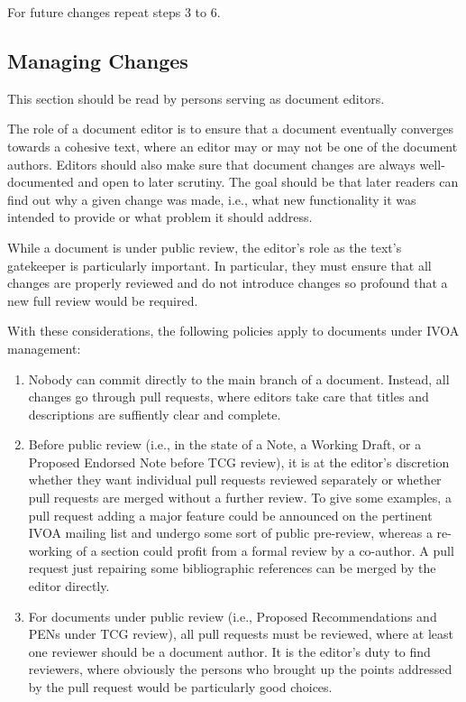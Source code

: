 \documentclass[11pt,a4paper]{ivoa}
\begin{document}
For future changes repeat steps 3 to 6.

\subsection{Managing Changes}
\label{sect:chmgt}

This section should be read by persons serving as document editors.

The role of a document editor is to ensure that a document eventually
converges towards a cohesive text, where an editor may or may not be one
of the document authors.  Editors should also make sure that
document changes are always well-documented and open to later scrutiny.
The goal should be that later readers can find out why a given change
was made, i.e., what new functionality it was intended to provide or
what problem it should address.

While a document is under public review, the editor's role as the text's
gatekeeper is particularly important.  In particular, they must ensure
that all changes are properly reviewed and do not introduce changes so
profound that a new full review would be required.

With these considerations, the following policies apply to documents
under IVOA management:

\begin{enumerate}
\renewcommand\theenumi{\alph{enumi}}
\item Nobody can commit directly to the main branch of a document.
Instead, all changes go through pull requests, where editors take care
that titles and descriptions are suffiently clear and complete.

\item Before public review (i.e., in the state of a Note, a Working
Draft, or a Proposed Endorsed Note before TCG review), it is at the
editor's discretion whether they want individual pull requests reviewed
separately or whether pull requests are merged without a further review.
To give some examples, a pull request adding a major feature could be
announced on the pertinent IVOA mailing list and undergo some sort of
public pre-review, whereas a re-working of a section could profit from a
formal review by a co-author.  A pull request just repairing some
bibliographic references can be merged by the editor directly.

\item For documents under public review (i.e., Proposed Recommendations
and PENs under TCG review), all pull requests must be reviewed, where at
least one reviewer should be a document author.  It is the editor's duty
to find reviewers, where obviously the persons who brought up the points
addressed by the pull request would be particularly good choices.
\end{enumerate}
\end{document}
